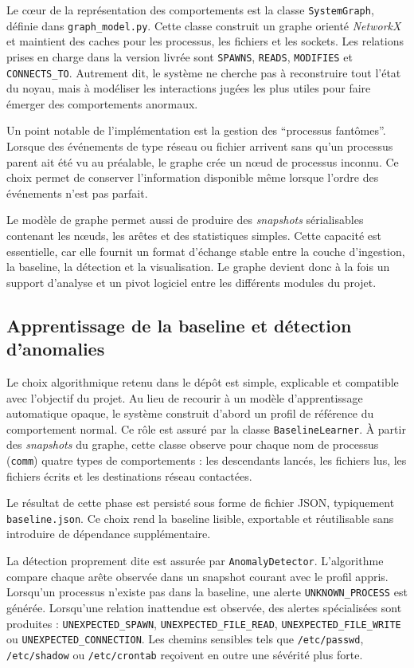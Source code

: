 \documentclass[a4paper,12pt]{article}
\begin{document}
Le cœur de la représentation des comportements est la classe \texttt{SystemGraph}, définie dans \texttt{graph\_model.py}. Cette classe construit un graphe orienté \textit{NetworkX} et maintient des caches pour les processus, les fichiers et les sockets. Les relations prises en charge dans la version livrée sont \texttt{SPAWNS}, \texttt{READS}, \texttt{MODIFIES} et \texttt{CONNECTS\_TO}. Autrement dit, le système ne cherche pas à reconstruire tout l'état du noyau, mais à modéliser les interactions jugées les plus utiles pour faire émerger des comportements anormaux.

Un point notable de l'implémentation est la gestion des ``processus fantômes''. Lorsque des événements de type réseau ou fichier arrivent sans qu'un processus parent ait été vu au préalable, le graphe crée un nœud de processus inconnu. Ce choix permet de conserver l'information disponible même lorsque l'ordre des événements n'est pas parfait.

Le modèle de graphe permet aussi de produire des \textit{snapshots} sérialisables contenant les nœuds, les arêtes et des statistiques simples. Cette capacité est essentielle, car elle fournit un format d'échange stable entre la couche d'ingestion, la baseline, la détection et la visualisation. Le graphe devient donc à la fois un support d'analyse et un pivot logiciel entre les différents modules du projet.

\subsection{Apprentissage de la baseline et détection d'anomalies}

Le choix algorithmique retenu dans le dépôt est simple, explicable et compatible avec l'objectif du projet. Au lieu de recourir à un modèle d'apprentissage automatique opaque, le système construit d'abord un profil de référence du comportement normal. Ce rôle est assuré par la classe \texttt{BaselineLearner}. À partir des \textit{snapshots} du graphe, cette classe observe pour chaque nom de processus (\texttt{comm}) quatre types de comportements : les descendants lancés, les fichiers lus, les fichiers écrits et les destinations réseau contactées.

Le résultat de cette phase est persisté sous forme de fichier JSON, typiquement \texttt{baseline.json}. Ce choix rend la baseline lisible, exportable et réutilisable sans introduire de dépendance supplémentaire.

La détection proprement dite est assurée par \texttt{AnomalyDetector}. L'algorithme compare chaque arête observée dans un snapshot courant avec le profil appris. Lorsqu'un processus n'existe pas dans la baseline, une alerte \texttt{UNKNOWN\_PROCESS} est générée. Lorsqu'une relation inattendue est observée, des alertes spécialisées sont produites : \texttt{UNEXPECTED\_SPAWN}, \texttt{UNEXPECTED\_FILE\_READ}, \texttt{UNEXPECTED\_FILE\_WRITE} ou \texttt{UNEXPECTED\_CONNECTION}. Les chemins sensibles tels que \texttt{/etc/passwd}, \texttt{/etc/shadow} ou \texttt{/etc/crontab} reçoivent en outre une sévérité plus forte.
\end{document}
